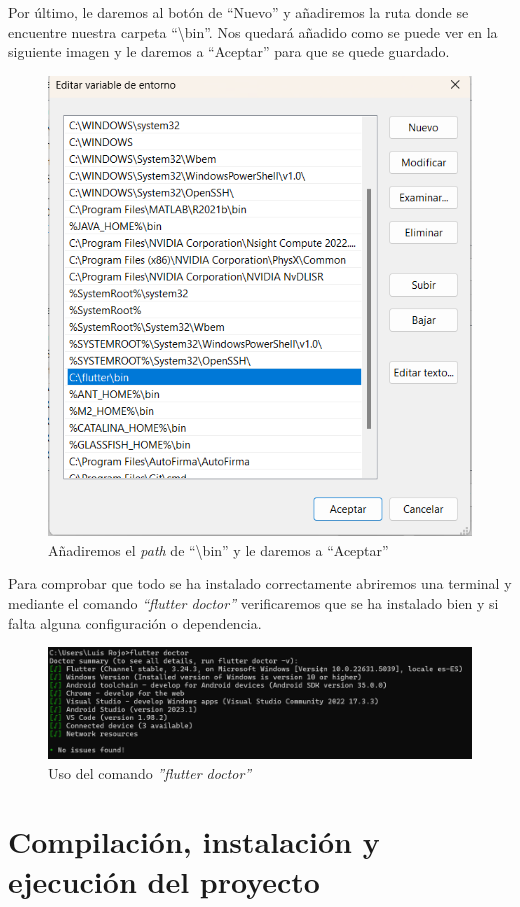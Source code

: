 Por último, le daremos al botón de ``Nuevo'' y añadiremos la ruta donde se encuentre nuestra carpeta ``\textbackslash bin''. Nos quedará añadido como se puede ver en la siguiente imagen y le daremos a ``Aceptar'' para que se quede guardado.

\begin{figure}[H]
    \centering
    \includegraphics[width=0.8\linewidth]{Variables_Entorno_3.png}
    \caption{Añadiremos el \textit{path} de ``\textbackslash bin'' y le daremos a ``Aceptar''}
    \label{C10}
\end{figure}

Para comprobar que todo se ha instalado correctamente abriremos una terminal y mediante el comando \textit{``flutter doctor''} verificaremos que se ha instalado bien y si falta alguna configuración o dependencia.

\begin{figure}[H]
    \centering
    \includegraphics[width=0.8\linewidth]{Comando_flutterdoctor.png}
    \caption{Uso del comando \textit{''flutter doctor''}}
    \label{C11}
\end{figure}

\section{Compilación, instalación y ejecución del proyecto}

